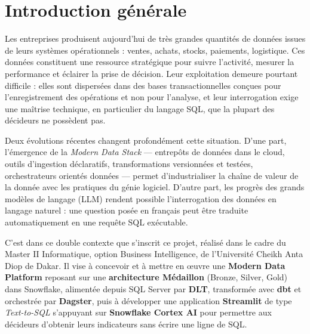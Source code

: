 \chapter*{Introduction générale}

Les entreprises produisent aujourd'hui de très grandes quantités de données issues de leurs systèmes
opérationnels : ventes, achats, stocks, paiements, logistique. Ces données constituent une ressource
stratégique pour suivre l'activité, mesurer la performance et éclairer la prise de décision. Leur
exploitation demeure pourtant difficile : elles sont dispersées dans des bases transactionnelles conçues
pour l'enregistrement des opérations et non pour l'analyse, et leur interrogation exige une maîtrise
technique, en particulier du langage SQL, que la plupart des décideurs ne possèdent pas.

Deux évolutions récentes changent profondément cette situation. D'une part, l'émergence de la
\emph{Modern Data Stack} --- entrepôts de données dans le cloud, outils d'ingestion déclaratifs,
transformations versionnées et testées, orchestrateurs orientés données --- permet d'industrialiser la
chaîne de valeur de la donnée avec les pratiques du génie logiciel. D'autre part, les progrès des
grands modèles de langage (LLM) rendent possible l'interrogation des données en langage naturel : une
question posée en français peut être traduite automatiquement en une requête SQL exécutable.

C'est dans ce double contexte que s'inscrit ce projet, réalisé dans le cadre du Master II Informatique,
option Business Intelligence, de l'Université Cheikh Anta Diop de Dakar. Il vise à concevoir et à mettre
en œuvre une \textbf{Modern Data Platform} reposant sur une \textbf{architecture Médaillon} (Bronze,
Silver, Gold) dans Snowflake, alimentée depuis SQL Server par \textbf{DLT}, transformée avec
\textbf{dbt} et orchestrée par \textbf{Dagster}, puis à développer une application \textbf{Streamlit}
de type \emph{Text-to-SQL} s'appuyant sur \textbf{Snowflake Cortex AI} pour permettre aux décideurs
d'obtenir leurs indicateurs sans écrire une ligne de SQL.

